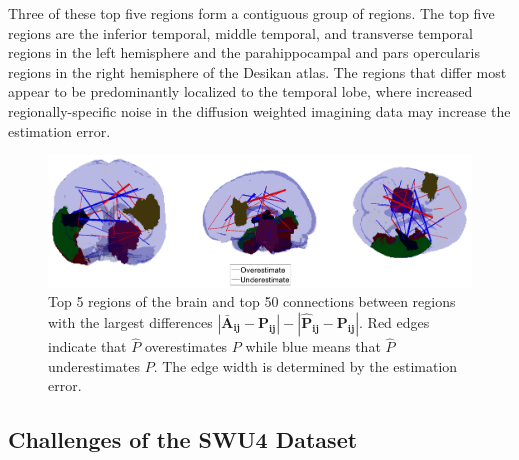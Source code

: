 \documentclass[journal,twoside,web]{ieeecolor}
\begin{document}
Three of these top five regions form a contiguous group of regions.
The top five regions are the inferior temporal, middle temporal, and transverse temporal regions in the left hemisphere and the parahippocampal and pars opercularis regions in the right hemisphere of the Desikan atlas.
The regions that differ most appear to be predominantly localized to the temporal lobe, where increased regionally-specific noise in the diffusion weighted imagining data may increase the estimation error.

\begin{figure}[!htbp]
\centering
\includegraphics[width=1\linewidth]{Diff_Between_desikan.png}
\caption{ Top 5 regions of the brain and top 50 connections between regions with the largest differences $\bm{|\bar{A}_{ij} - P_{ij}| - |\hat{P}_{ij} - P_{ij}|}$.
Red edges indicate that $\hat{P}$ overestimates $P$ while blue means that $\hat{P}$ underestimates $P$. The edge width is determined by the estimation error. 
}
\label{fig:Diff_between_desikan}
\end{figure}

\subsection{Challenges of the SWU4 Dataset}
\label{sec:challenge}
\end{document}
